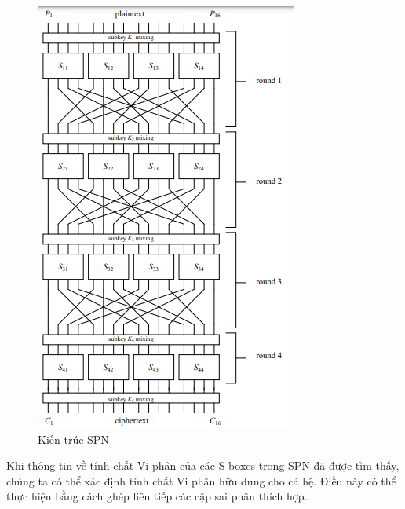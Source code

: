 \begin{figure}[H]
    \centering
    \includegraphics[scale=1.2]{Ảnh/triều/SPN.png}
    
    \caption{Kiến trúc SPN}
\end{figure}


Khi thông tin về tính chất Vi phân của các S-boxes trong SPN đã được tìm thấy, chúng ta có thể xác định tính chất Vi phân hữu dụng cho cả hệ. Điều này có thể thực hiện bằng cách ghép liên tiếp các cặp sai phân thích hợp. 

